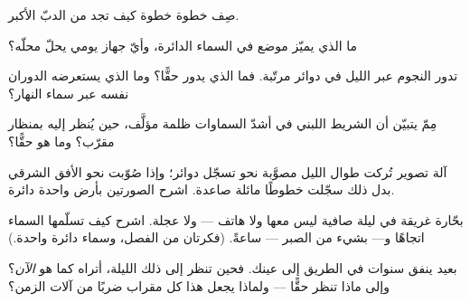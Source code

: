 \begin{exercise}[$\star$]\label{exo:g5:stars-night-sky:5}
صِف خطوة خطوة كيف تجد  من الدبّ الأكبر.
\end{exercise}

\begin{exercise}[$\star$]\label{exo:g5:stars-night-sky:6}
ما الذي يميّز موضع  في السماء الدائرة، وأيّ جهاز
يومي يحلّ محلّه؟
\end{exercise}

\begin{exercise}[$\star$]\label{exo:g5:stars-night-sky:7}
تدور النجوم عبر الليل في دوائر مرتّبة. فما الذي يدور حقًّا؟ وما
الذي يستعرضه الدوران نفسه عبر سماء النهار؟
\end{exercise}

\begin{exercise}[$\star$]\label{exo:g5:stars-night-sky:8}
مِمّ يتبيّن أن الشريط اللبني في أشدّ السماوات ظلمة مؤلَّف، حين
يُنظر إليه بمنظار مقرّب؟ وما هو حقًّا؟
\end{exercise}

\begin{exercise}[$\star\star$]\label{exo:g5:stars-night-sky:9}
آلة تصوير تُركت طوال الليل مصوَّبة نحو  تسجّل
دوائر؛ وإذا صُوّبت نحو الأفق الشرقي بدل ذلك سجّلت خطوطًا مائلة
صاعدة. اشرح الصورتين بأرض واحدة دائرة.
\end{exercise}

\begin{exercise}[$\star\star$]\label{exo:g5:stars-night-sky:10}
بحّارة غريقة في ليلة صافية ليس معها  ولا هاتف --- ولا
عجلة. اشرح كيف تسلّمها السماء اتجاهًا و--- بشيء من الصبر ---
ساعةً. (فكرتان من الفصل، وسماء دائرة واحدة.)
\end{exercise}

\begin{exercise}[$\star\star$]\label{exo:g5:stars-night-sky:11}
  بعيد ينفق سنوات في الطريق إلى عينك. فحين تنظر إلى ذلك
 الليلة، أتراه كما هو \emph{الآن}؟ وإلى ماذا تنظر حقًّا ---
ولماذا يجعل هذا كل مقراب ضربًا من آلات الزمن؟
\end{exercise}
